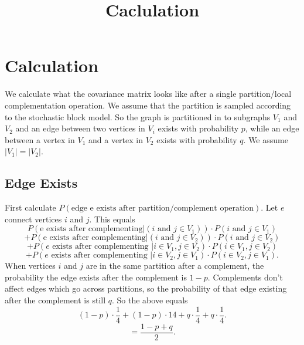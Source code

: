 \documentclass{article}
\title{Caclulation}
\date{}
\begin{document}
\maketitle

\section{Calculation}
We calculate what the covariance matrix looks like after a single partition/local complementation operation. We assume that the partition is sampled according to the stochastic block model. So the graph is partitioned in to subgraphs $V_1$ and $V_2$ and an edge between two vertices in $V_i$ exists with probability $p$, while an edge between a vertex in $V_1$ and a vertex in $V_2$ exists with probability $q$. We assume $|V_1| = |V_2|$.  
\subsection{Edge Exists}
First calculate $P(\text{edge e exists after partition/complement operation})$. Let $e$ connect vertices $i$ and $j$. This equals $$P(\text{e exists after complementing}|(i \text{ and }j \in V_1))\cdot P(i \text{ and }j \in V_1)$$ $$+ P(\text{e exists after complementing}|(i \text{ and }j \in V_2))\cdot P(i \text{ and }j \in V_2)$$ $$+ P(e \text{ exists after complementing }|i \in V_1, j \in V_2) \cdot P(i \in V_1, j \in V_2)$$ $$+ P(e \text{ exists after complementing }|i \in V_2, j \in V_1) \cdot P(i \in V_2, j\in V_1).$$ When vertices $i$ and $j$ are in the same partition after a complement, the probability the edge exists after the complement is $1-p$. Complements don't affect edges which go across partitions, so the probability of that edge existing after the complement is still $q$. So the above equals $$(1-p)\cdot \frac{1}{4} + (1-p)\cdot{1}{4} + q\cdot \frac{1}{4} + q\cdot \frac{1}{4}.$$ $$= \frac{1 - p + q}{2}.$$
\end{document}
